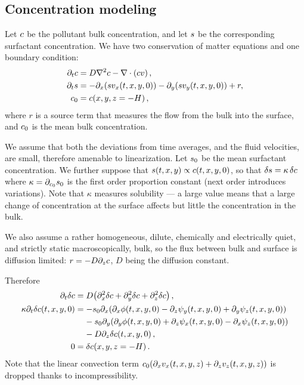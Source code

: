 \documentclass[reqno]{amsart}
\numberwithin{equation}{section}
\numberwithin{figure}{section}
\begin{document}
\subsection{Concentration modeling}

Let $c$ be the pollutant bulk concentration, and let $s$ be the corresponding surfactant concentration. We have two conservation of matter equations and one boundary condition:
\begin{align*}
\partial_{t}c &= D\nabla^{2}c-\nabla\cdot\left(c v\right), \\
\partial_{t}s &= -\partial_{x}\!\left(s v_{x}\!\left(t,x,y,0\right)\right)
                       -\partial_{y}\!\left(s v_{y}\!\left(t,x,y,0\right)\right)+r, \\
c_{0}         &= c\!\left(x,y,z=-H\right),
\end{align*}
where $r$ is a source term that measures the flow from the bulk into the surface, and $c_{0}$ is the mean bulk concentration.

We assume that both the deviations from time averages, and the fluid velocities, are small, therefore amenable to linearization. Let $s_{0}$ be the mean surfactant concentration. We further suppose that $s\!\left(t,x,y\right)\propto c\!\left(t,x,y,0\right)$, so that $\delta s=\kappa\,\delta c$ where $\kappa=\partial_{c_{0}}s_{0}$ is the first order proportion constant (next order introduces variations). Note that $\kappa$ measures solubility --- a large value means that a large change of concentration at the surface affects but little the concentration in the bulk.

We also assume a rather homogeneous, dilute, chemically and electrically quiet, and strictly static macroscopically, bulk, so the flux between bulk and surface is diffusion limited: $r=-D\partial_{z}c$, $D$ being the diffusion constant.

Therefore
\begin{align*}
\partial_{t}\delta\sBulkCo
  &= D\!\left(\partial_{x}^{2}\delta\sBulkCo+\partial_{y}^{2}\delta\sBulkCo+\partial_{z}^{2}\delta\sBulkCo\right), \\
\kappa\partial_{t}\delta\sBulkCo\!\left(t,x,y,0\right)
  &= -\sSurfCo_{0}\partial_{x}\!\left(\partial_{x}\vPotential\!\left(t,x,y,0\right)-\partial_{z}\vStream_{y}\!\left(t,x,y,0\right)+\partial_{y}\vStream_{z}\!\left(t,x,y,0\right)\right) \\
  &\phantom{=}\,\,-\sSurfCo_{0}\partial_{y}\!\left(\partial_{y}\vPotential\!\left(t,x,y,0\right)+\partial_{z}\vStream_{x}\!\left(t,x,y,0\right)-\partial_{x}\vStream_{z}\!\left(t,x,y,0\right)\right) \\
  &\phantom{=}\,\,-D\partial_{z}\delta\sBulkCo\!\left(t,x,y,0\right), \\
0 &= \delta\sBulkCo\!\left(x,y,z=-\aHeight\right).
\end{align*}
Note that the linear convection term $c_{0}\!\left(\partial_{x}v_{x}\!\left(t,x,y,z\right)+\partial_{z}v_{z}\!\left(t,x,y,z\right)\right)$ is dropped thanks to incompressibility.
\end{document}
